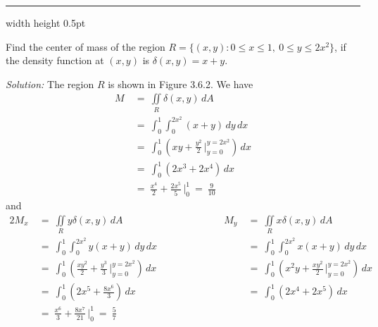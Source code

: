 \vspace{3mm}
\hrule width \textwidth height 0.5pt
\begin{exmp}
 Find the center of mass of the region $R = \lbrace (x,y): 0 \le x \le 1,~ 0 \le y \le 2x^2 \rbrace$,
 if the density function at $(x,y)$ is $\delta(x,y) = x+y$.\vspace{0.5mm}
 \piccaption[]{}
 \par\noindent \emph{Solution:} The region $R$ is shown in Figure 3.6.2. We have
 \begin{align*}
  M ~&=~ \iint\limits_{R} \delta(x,y)\,dA\\
   &=~ \int_0^1 \int_0^{2x^2} (x+y)\,dy\,dx\\
   &=~ \int_0^1 \left( xy + \frac{y^2}{2} \,\Bigg|_{y=0}^{y=2x^2} \right) \,dx\\
   &=~ \int_0^1 ( 2x^3 + 2x^4 ) \,dx\\
   &=~ \frac{x^4}{2} + \frac{2x^5}{5} \,\Bigg|_0^1 ~=~ \frac{9}{10}
 \end{align*}
 and
 \begin{alignat*}{2}
  M_x ~&=~ \iint\limits_{R} y\delta(x,y)\,dA & M_y ~&=~ \iint\limits_{R} x\delta(x,y)\,dA\\
  &=~ \int_0^1 \int_0^{2x^2} y(x+y)\,dy\,dx \qquad\qquad\qquad & \phantom{M_y} &=~ \int_0^1 \int_0^{2x^2} x(x+y)\,dy\,dx\\
  &=~ \int_0^1 \left( \frac{xy^2}{2} + \frac{y^3}{3} \,\Bigg|_{y=0}^{y=2x^2} \right) \,dx & \phantom{M_y}
  &=~ \int_0^1 \left( x^2 y + \frac{xy^2}{2} \,\Bigg|_{y=0}^{y=2x^2} \right) \,dx\\
  &=~ \int_0^1 ( 2x^5 + \frac{8x^6}{3} ) \,dx & \phantom{M_y} &=~ \int_0^1 ( 2x^4 + 2x^5 ) \,dx\\
  &=~ \frac{x^6}{3} + \frac{8x^7}{21} \,\Bigg|_0^1 ~=~ \frac{5}{7} & \phantom{M_y}

\end{alignat*}
\end{exmp}
